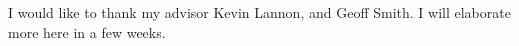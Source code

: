 \documentclass[final,numrefs,sort&compress,noinfo]{nddiss2e}
\begin{document}
\tableofcontents
\listoffigures
\listoftables



\begin{acknowledge}
I would like to thank my advisor Kevin Lannon, and Geoff Smith. I will elaborate more here in a few weeks. 
\end{acknowledge}

\mainmatter









\appendix


\backmatter              %

\end{document}
